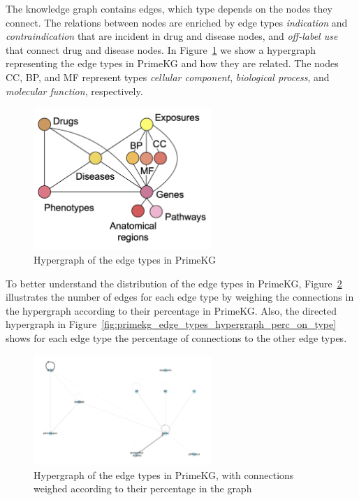The knowledge graph contains  edges, which type depends on the nodes they connect. The relations between nodes are enriched by edge types \textsl{indication} and \textsl{contraindication} that are incident in drug and disease nodes, and \textsl{off-label use} that connect drug and disease nodes. In Figure~\ref{fig:primekg_edge_types_hypergraph} we show a hypergraph representing the edge types in PrimeKG and how they are related. The nodes CC, BP, and MF represent types \textsl{cellular component}, \textsl{biological process}, and \textsl{molecular function}, respectively.
\begin{figure}
    \centering
    \includegraphics[width=0.6\textwidth]{figs/edge_types_hypergraph.png}
    \caption{Hypergraph of the edge types in PrimeKG}
    \label{fig:primekg_edge_types_hypergraph}
\end{figure}
To better understand the distribution of the edge types in PrimeKG, Figure~\ref{fig:primekg_edge_types_hypergraph_perc} illustrates the number of edges for each edge type by weighing the connections in the hypergraph according to their percentage in PrimeKG. Also, the directed hypergraph in Figure~\ref{fig:primekg_edge_types_hypergraph_perc_on_type} shows for each edge type the percentage of connections to the other edge types.
\begin{figure}
    \centering
    \includegraphics[width=0.6\textwidth]{figs/primekg_edge_types_perc.png}
    \caption{Hypergraph of the edge types in PrimeKG, with connections weighed according to their percentage in the graph}
    \label{fig:primekg_edge_types_hypergraph_perc}
\end{figure}
